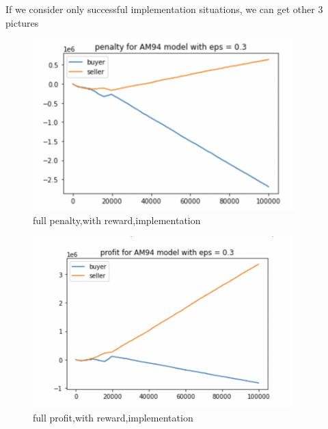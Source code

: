 \documentclass[11pt]{article}
\begin{document}
If we consider only successful implementation situations, we can get other 3 pictures

\begin{figure}[H]
	\begin{center}
	\includegraphics[width=0.9\textwidth]{16.PNG}
	\end{center}
	\caption{full penalty,with reward,implementation}
	\label{FIG.16}
\end{figure}

\begin{figure}[H]
	\begin{center}
	\includegraphics[width=0.9\textwidth]{17.PNG}
	\end{center}
	\caption{full profit,with reward,implementation}
	\label{FIG.17}
\end{figure}
\end{document}
